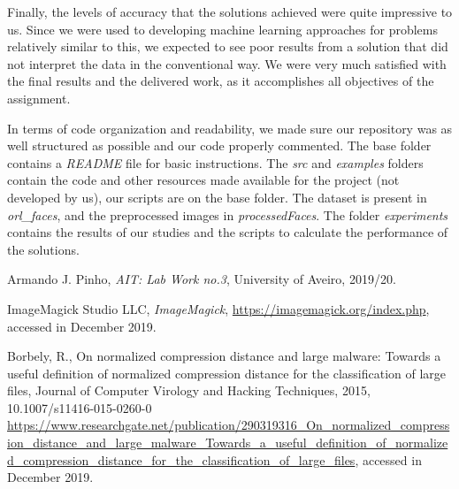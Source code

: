 \documentclass[12pt]{article}
\begin{document}
Finally, the levels of accuracy that the solutions achieved were quite impressive to us.
Since we were used to developing machine learning approaches for problems relatively similar to this, we expected to see poor results from a solution that did 
not interpret the data in the conventional way.
We were very much satisfied with the final results and the delivered work, as it accomplishes all objectives of the assignment.

In terms of code organization and readability, we made sure our repository was as well structured as possible and our code properly commented.
The base folder contains a \textit{README} file for basic instructions.
The \textit{src} and \textit{examples} folders contain the code and other resources made available for the project (not developed by us), our scripts are on the base folder.
The dataset is present in \textit{orl\_faces}, and the preprocessed images in \textit{processedFaces}.
The folder \textit{experiments} contains the results of our studies and the scripts to calculate the performance of the solutions.

\begin{thebibliography}{9} %
  

    Armando J. Pinho,
    \textit{AIT: Lab Work no.3},
    University of Aveiro,
    2019/20.
  
    ImageMagick Studio LLC,
    \textit{ImageMagick},
    \url{https://imagemagick.org/index.php},
    accessed in December 2019.

    Borbely, R.,
    On normalized compression distance and large malware: Towards a
    useful definition of normalized compression distance for the classification of
    large files,
    Journal of Computer Virology and Hacking Techniques,
    2015,
    10.1007/s11416-015-0260-0
    \url{https://www.researchgate.net/publication/290319316_On_normalized_compression_distance_and_large_malware_Towards_a_useful_definition_of_normalized_compression_distance_for_the_classification_of_large_files},
    accessed in December 2019.
  
\end{thebibliography}

\clearpage
\end{document}
